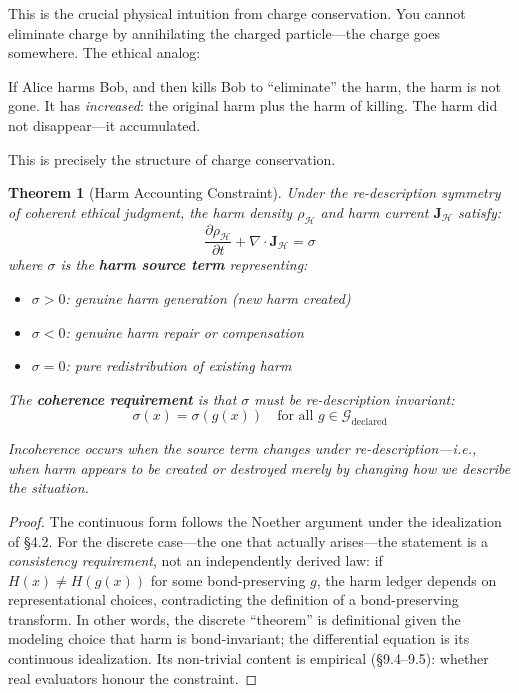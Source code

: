 \documentclass[12pt,letterpaper]{article}
\newtheorem{theorem}{Theorem}[section]
\theoremstyle{definition}
\theoremstyle{remark}
\newcommand{\harm}{\mathcal{H}}
\newcommand{\G}{\mathcal{G}}
\begin{document}
This is the crucial physical intuition from charge conservation. You cannot eliminate charge by annihilating the charged particle---the charge goes somewhere. The ethical analog:

\begin{center}
\end{center}

If Alice harms Bob, and then kills Bob to ``eliminate'' the harm, the harm is not gone. It has \textit{increased}: the original harm plus the harm of killing. The harm did not disappear---it accumulated.

This is precisely the structure of charge conservation.

\begin{theorem}[Harm Accounting Constraint]
Under the re-description symmetry of coherent ethical judgment, the harm density $\rho_\harm$ and harm current $\mathbf{J}_\harm$ satisfy:
\begin{equation}
\frac{\partial \rho_\harm}{\partial t} + \nabla \cdot \mathbf{J}_\harm = \sigma
\end{equation}
where $\sigma$ is the \textbf{harm source term} representing:
\begin{itemize}
    \item $\sigma > 0$: genuine harm generation (new harm created)
    \item $\sigma < 0$: genuine harm repair or compensation
    \item $\sigma = 0$: pure redistribution of existing harm
\end{itemize}

The \textbf{coherence requirement} is that $\sigma$ must be re-description invariant:
\begin{equation}
\sigma(x) = \sigma(g(x)) \quad \text{for all } g \in \G_{\text{declared}}
\end{equation}

Incoherence occurs when the source term changes under re-description---i.e., when harm appears to be created or destroyed merely by changing how we describe the situation.
\end{theorem}

\begin{proof}
The continuous form follows the Noether argument under the idealization of \S4.2. For the discrete case---the one that actually arises---the statement is a \emph{consistency requirement}, not an independently derived law: if $H(x) \neq H(g(x))$ for some bond-preserving $g$, the harm ledger depends on representational choices, contradicting the definition of a bond-preserving transform. In other words, the discrete ``theorem'' is definitional given the modeling choice that harm is bond-invariant; the differential equation is its continuous idealization. Its non-trivial content is empirical (\S9.4--9.5): whether real evaluators honour the constraint.
\end{proof}
\end{document}
